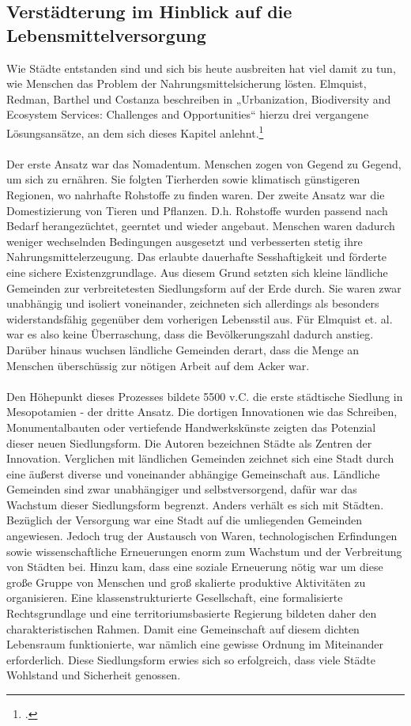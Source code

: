 \documentclass{scrartcl}
\begin{document}
\subsection{Verstädterung im Hinblick auf die Lebensmittelversorgung}
Wie Städte entstanden sind und sich bis heute ausbreiten hat viel damit zu tun, wie Menschen das Problem der Nahrungsmittelsicherung lösten. Elmquist, Redman, Barthel und Costanza beschreiben in „Urbanization, Biodiversity and Ecosystem Services: Challenges and Opportunities“ hierzu drei vergangene Lösungsansätze, an dem sich dieses Kapitel anlehnt.\footcite[S.14ff]{Elmqvist2013} 
\\
\\ 
Der erste Ansatz war das Nomadentum. Menschen zogen von Gegend zu Gegend, um sich zu ernähren. Sie folgten Tierherden sowie klimatisch günstigeren Regionen, wo nahrhafte Rohstoffe zu finden waren. Der zweite Ansatz war die Domestizierung von Tieren und Pflanzen. D.h. Rohstoffe wurden passend nach Bedarf herangezüchtet, geerntet und wieder angebaut. Menschen waren dadurch weniger wechselnden Bedingungen ausgesetzt und verbesserten stetig ihre Nahrungsmittelerzeugung. Das erlaubte dauerhafte Sesshaftigkeit und förderte eine sichere Existenzgrundlage. Aus diesem Grund setzten sich kleine ländliche Gemeinden zur verbreitetesten Siedlungsform auf der Erde durch. Sie waren zwar unabhängig und isoliert voneinander, zeichneten sich allerdings als besonders widerstandsfähig gegenüber dem vorherigen Lebensstil aus. Für Elmquist et. al. war es also keine Überraschung, dass die Bevölkerungszahl dadurch anstieg. Darüber hinaus wuchsen ländliche Gemeinden derart, dass die Menge an Menschen überschüssig zur nötigen Arbeit auf dem Acker war. \\
\\
Den Höhepunkt dieses Prozesses bildete 5500 v.C. die erste städtische Siedlung in Mesopotamien - der dritte Ansatz. Die dortigen Innovationen wie das Schreiben, Monumentalbauten oder vertiefende Handwerkskünste zeigten das Potenzial dieser neuen Siedlungsform. Die Autoren bezeichnen Städte als Zentren der Innovation. Verglichen mit ländlichen Gemeinden zeichnet sich eine Stadt durch eine äußerst diverse und voneinander abhängige Gemeinschaft aus. Ländliche Gemeinden sind zwar unabhängiger und selbstversorgend, dafür war das Wachstum dieser Siedlungsform begrenzt. Anders verhält es sich mit Städten. Bezüglich der Versorgung war eine Stadt auf die umliegenden Gemeinden angewiesen. Jedoch trug der Austausch von Waren, technologischen Erfindungen sowie wissenschaftliche Erneuerungen enorm zum Wachstum und der Verbreitung von Städten bei. Hinzu kam, dass eine soziale Erneuerung nötig war um diese große Gruppe von Menschen und groß skalierte produktive Aktivitäten zu organisieren. Eine klassenstrukturierte Gesellschaft, eine formalisierte Rechtsgrundlage und eine territoriumsbasierte Regierung bildeten daher den charakteristischen Rahmen. Damit eine Gemeinschaft auf diesem dichten Lebensraum funktionierte, war nämlich eine gewisse Ordnung im Miteinander erforderlich. Diese Siedlungsform erwies sich so erfolgreich, dass viele Städte Wohlstand und Sicherheit genossen. 
\end{document}
